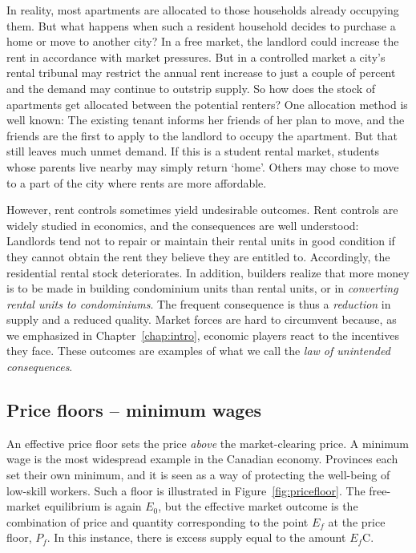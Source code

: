 In reality, most apartments are allocated to those households already
occupying them. But what happens when such a resident household decides to
purchase a home or move to another city? In a free market, the landlord
could increase the rent in accordance with market pressures. But in a
controlled market a city's rental tribunal may restrict the annual rent
increase to just a couple of percent and the demand may continue to
outstrip supply. So how does the stock of apartments get allocated between
the potential renters? One allocation method is well known: The existing
tenant informs her friends of her plan to move, and the friends are the
first to apply to the landlord to occupy the apartment. But that still
leaves much unmet demand. If this is a student rental market, students whose
parents live nearby may simply return `home'. Others may chose to move to a
part of the city where rents are more affordable.

\newhtmlpage




However, rent controls sometimes yield undesirable outcomes. Rent
controls are widely studied in economics, and the consequences are well
understood: Landlords tend not to repair or maintain their rental units in
good condition if they cannot obtain the rent they believe they are entitled
to. Accordingly, the residential rental stock deteriorates. In addition,
builders realize that more money is to be made in building condominium units
than rental units, or in \textit{converting rental units to condominiums}.
The frequent consequence is thus a \textit{reduction} in supply and a
reduced quality. Market forces are hard to circumvent because, as we
emphasized in Chapter~\ref{chap:intro}, economic players react to the
incentives they face. These outcomes are examples of what we call the 
\textit{law of unintended consequences}.

\newhtmlpage

\subsection*{Price floors -- minimum wages}

An effective price floor sets the price \textit{above} the market-clearing
price. A minimum wage is the most widespread example in the Canadian
economy. Provinces each set their own minimum, and it is seen as a way of
protecting the well-being of low-skill workers. Such a floor is illustrated
in Figure~\ref{fig:pricefloor}. The free-market equilibrium is again $E_0$,
but the effective market outcome is the combination of price and quantity
corresponding to the point $E_f$ at the price floor, $P_f$. In this
instance, there is excess supply equal to the amount $E_f$C.

